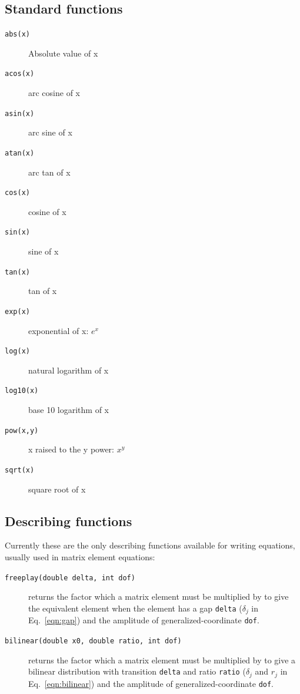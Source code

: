 \documentclass[11pt,openany,twoside]{book}
\numberwithin{equation}{section}		%
\newcommand{\Code}[1]{{\small\tt #1}}
\newcommand{\Eqn}[1]{Eq.\ \ref{#1}}  %
\begin{document}
\subsection{Standard functions}
\begin{description}
	\item[\Code{abs(x)}] Absolute value of x 
	\item[\Code{acos(x)}] arc cosine of x 
	\item[\Code{asin(x)}] arc sine of x 
	\item[\Code{atan(x)}] arc tan of x 
	\item[\Code{cos(x)}] cosine of x 
	\item[\Code{sin(x)}] sine of x 
	\item[\Code{tan(x)}] tan of x 
	\item[\Code{exp(x)}] exponential of x: $e^x$ 
	\item[\Code{log(x)}] natural logarithm of x 
	\item[\Code{log10(x)}] base 10 logarithm of x 
	\item[\Code{pow(x,y)}] x raised to the y power: $x^y$ 
	\item[\Code{sqrt(x)}] square root of x 
\end{description}

\subsection{Describing functions}\label{sect:eqn-df}
Currently these are the only describing functions available for
writing equations, usually used in matrix element equations:

\begin{description}
\item[\Code{freeplay(double delta, int dof)}]
   returns the factor which a matrix element must be multiplied
	by to give the equivalent element when the element has a gap
	\Code{delta} ($\delta_j$ in \Eqn{eqn:gap}) and the amplitude of
	generalized-coordinate \Code{dof}. 
\item[\Code{bilinear(double x0, double ratio, int dof)}]
returns the factor which a matrix element must be multiplied by to give
a bilinear distribution with transition \Code{delta} and ratio \Code{ratio}
($\delta_j$ and $r_j$ in \Eqn{eqn:bilinear}) and the amplitude of
generalized-coordinate \Code{dof}.
\end{description}
\end{document}
